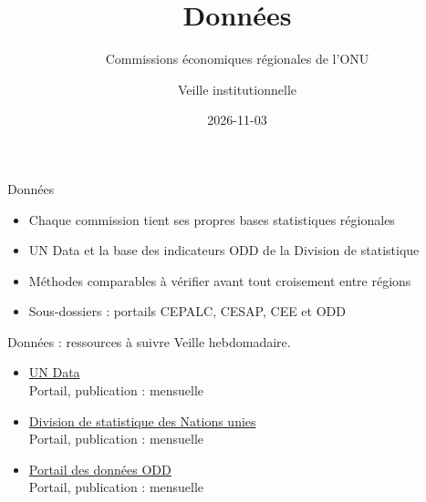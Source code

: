 \documentclass[aspectratio=169,11pt]{beamer}
\title{Données}
\subtitle{Commissions économiques régionales de l'ONU}
\author{Veille institutionnelle}
\date{2026-11-03}
\begin{document}
\begin{frame}\titlepage\end{frame}

\begin{frame}{Données}
\begin{itemize}
\item Chaque commission tient ses propres bases statistiques régionales
\item UN Data et la base des indicateurs ODD de la Division de statistique
\item Méthodes comparables à vérifier avant tout croisement entre régions
\item Sous-dossiers : portails CEPALC, CESAP, CEE et ODD
\end{itemize}
\end{frame}

\begin{frame}{Données : ressources à suivre}
\small
Veille hebdomadaire.
\begin{itemize}
\item \href{https://data.un.org}{UN Data}\\{\footnotesize Portail, publication : mensuelle}
\item \href{https://unstats.un.org}{Division de statistique des Nations unies}\\{\footnotesize Portail, publication : mensuelle}
\item \href{https://unstats.un.org/sdgs}{Portail des données ODD}\\{\footnotesize Portail, publication : mensuelle}
\end{itemize}
\end{frame}
\end{document}
